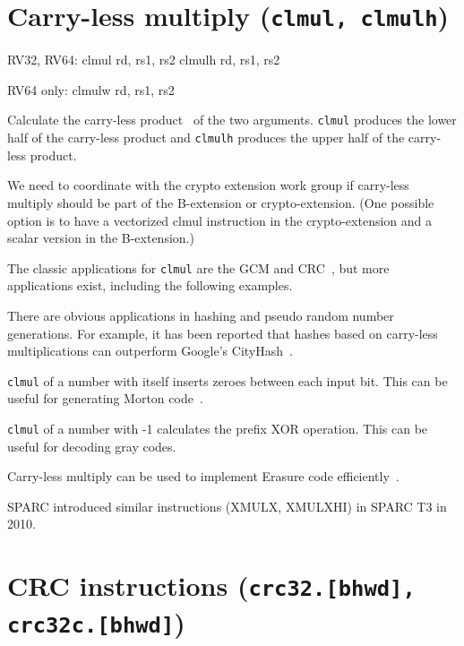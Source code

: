 
\section{Carry-less multiply (\texttt{clmul, clmulh})}

\begin{rvb}
  RV32, RV64:
    clmul rd, rs1, rs2
    clmulh rd, rs1, rs2

  RV64 only:
    clmulw rd, rs1, rs2
\end{rvb}

Calculate the carry-less product~\cite{CarryLessProduct} of the two arguments. \texttt{clmul}
produces the lower half of the carry-less product and \texttt{clmulh} produces the upper half
of the carry-less product.

We need to coordinate with the crypto extension work group if carry-less multiply should
be part of the B-extension or crypto-extension. (One possible option is to have a vectorized
clmul instruction in the crypto-extension and a scalar version in the B-extension.)



The classic applications for \texttt{clmul} are the GCM and CRC~\cite{FastCRC,Wolf18A}, but more
applications exist, including the following examples.

There are obvious applications in hashing and pseudo random number generations. For
example, it has been reported that hashes based on carry-less multiplications can
outperform Google's CityHash~\cite{CLHASH}.

\texttt{clmul} of a number with itself inserts zeroes between each input bit. This can
be useful for generating Morton code~\cite{MortonCode}.

\texttt{clmul} of a number with -1 calculates the prefix XOR operation. This can
be useful for decoding gray codes.

Carry-less multiply can be used to implement Erasure code efficiently~\cite{ClmulErasureCode}.

SPARC introduced similar instructions (XMULX, XMULXHI) in SPARC T3 in 2010.


\section{CRC instructions (\texttt{crc32.[bhwd], crc32c.[bhwd]})}

